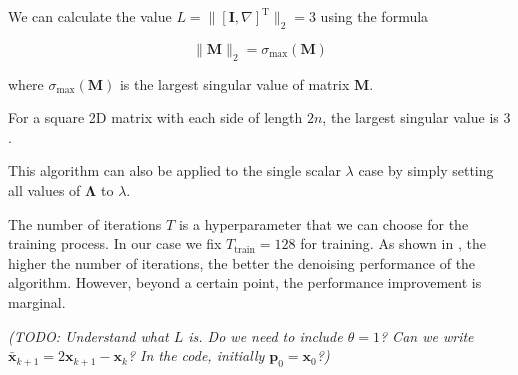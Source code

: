 \documentclass[12pt]{article}
\begin{document}
We can calculate the value $L = \| [\mathbf{I}, \nabla]^\text{T} \|_2 = 3$ using the formula

\begin{equation*}
    \| \mathbf{M} \|_2 = \sigma_{\text{max}}(\mathbf{M})
\end{equation*}

where  $\sigma_{\text{max}}(\mathbf{M})$ is the largest singular value of matrix $\mathbf{M}$.

For a square 2D matrix with each side of length $2n$, the largest singular value is $3$.


This algorithm can also be applied to the single scalar $\lambda$ case by simply setting all values of $\mathbf{\Lambda}$ to $\lambda$.

The number of iterations $T$ is a hyperparameter that we can choose for the training process.
In our case we fix $T_{\text{train}} = 128$ for training.
As shown in \cite{kofler2023learning}, the higher the number of iterations, the better the denoising performance of the algorithm. 
However, beyond a certain point, the performance improvement is marginal.





\textit{
(TODO: Understand what $L$ is. Do we need to include $\theta = 1$? Can we write $\bar{\mathbf{x}}_{k+1} = 2 \mathbf{x}_{k+1} - \mathbf{x}_k$? In the code, initially $\mathbf{p}_0 = \mathbf{x}_0$?)
}




\end{document}
